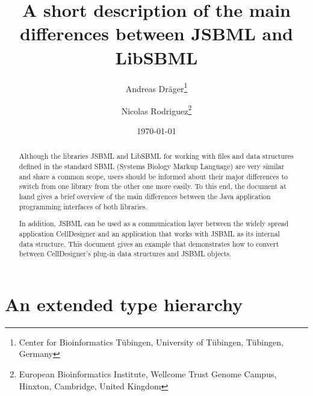 \documentclass[
  BCOR12mm,
  letterpaper,
  11pt,
  headsepline,
  pointlessnumbers,
  tablecaptionabove,
  headinclude,
  appendixprefix,
  idxtotoc,
  bibtotoc,
  twoside,
  titlepage
]{scrartcl}
\title{A short description of the main differences between JSBML and LibSBML}
\author{Andreas Dr\"ager\thanks{Center for Bioinformatics T\"ubingen, University
of T\"ubingen, T\"ubingen, Germany}\and%
Nicolas Rodriguez\thanks{European Bioinformatics Institute, Wellcome Trust
Genome Campus, Hinxton, Cambridge, United Kingdom}}
\date{\today}
\begin{document}
\maketitle
\tableofcontents

\begin{abstract}
Although the libraries JSBML and LibSBML for working with files and data
structures defined in the standard SBML (Systems Biology Markup Language) are
very similar and share a common scope, users should be informed about their
major differences to switch from one library from the other one more easily. To
this end, the document at hand gives a brief overview of the main differences
between the Java\texttrademark{} application programming interfaces of both
libraries.

In addition, JSBML can be used as a communication layer between the widely
spread application CellDesigner and an application that works with JSBML as its
internal data structure. This document gives an example that demonstrates how to
convert between CellDesigner's plug-in data structures and JSBML objects.
\end{abstract}

\section{An extended type hierarchy}
\end{document}
